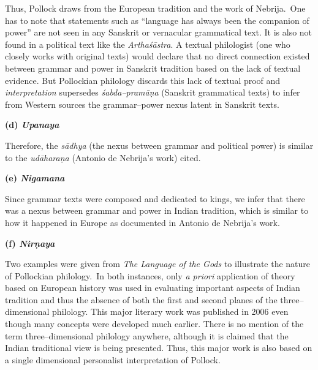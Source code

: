 Thus, Pollock draws from the European tradition and the work of Nebrija.~One has to note that statements such as “language has always been the companion of power” are not seen in any Sanskrit or vernacular grammatical text. It is also not found in a political text like the \textit{Arthaśāstra}. A textual philologist (one who closely works with original texts) would declare that no direct connection existed between grammar and power in Sanskrit tradition based on the lack of textual evidence. But Pollockian philology discards this lack of textual proof and \textit{interpretation} supersedes \textit{śabda–pramāṇa} (Sanskrit grammatical texts) to infer from Western sources the grammar–power nexus latent in Sanskrit texts.

\textbf{(d) \textit{Upanaya}}

Therefore, the \textit{sādhya} (the nexus between grammar and political power) is similar to the \textit{udāharaṇa} (Antonio de Nebrija’s work) cited.

\textbf{(e) \textit{Nigamana}}

Since grammar texts were composed and dedicated to kings, we infer that there was a nexus between grammar and power in Indian tradition, which is similar to how it happened in Europe as documented in Antonio de Nebrija’s work.

\textbf{(f) \textit{Nirṇaya}}

Two examples were given from \textit{The Language of the Gods} to illustrate the nature of Pollockian philology.~In both instances, only \textit{a priori} application of theory based on European history was used in evaluating important aspects of Indian tradition and thus the absence of both the first and second planes of the three–dimensional philology. This major literary work was published in 2006 even though many concepts were developed much earlier. There is no mention of the term three–dimensional philology anywhere, although it is claimed that the Indian traditional view is being presented. Thus, this major work is also based on a single dimensional personalist interpretation of Pollock.

